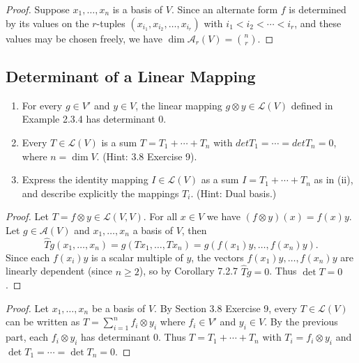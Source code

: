 \begin{proof}
    Suppose $x_1, \ldots, x_n$ is a basis of $V$.
    Since an alternate form $f$ is
    determined by its values on the $r$-tuples $(x_{i_1}, x_{i_2}, \ldots, x_{i_r})$ with
    $i_1 < i_2 < \cdots < i_r$, and these values may be chosen freely,
    we have $\dim \mathcal{A}_r(V) = \binom{n}{r}$.
\end{proof}

\subsection{Determinant of a Linear Mapping}


\begin{tcolorbox}[title=Problem 1, breakable]
    \begin{enumerate}
        \item For every $g \in V'$ and $y \in V$, the linear mapping 
        $g \otimes y \in \mathcal{L}(V)$ defined in Example 2.3.4 has determinant $0$.
        \item Every $T \in \mathcal{L}(V)$ is a sum $T = T_1 + \cdots + T_n$ with $det T_1 = \cdots = det T_n = 0$,
        where $n = \dim V$. (Hint: 3.8 Exercise 9).
        \item Express the identity mapping $I \in \mathcal{L}(V)$ as a sum $I = T_1 + \cdots + T_n$
        as in (ii), and describe explicitly the mappings $T_i$. (Hint: Dual basis.)
    \end{enumerate}
\end{tcolorbox}

\begin{proof}
    Let $T = f \otimes y \in \mathcal{L}(V, V)$.
    For all $x \in V$ we have $(f \otimes y)(x) = f(x)y$.
    Let $g \in \mathcal{A}(V)$ and $x_1, \ldots, x_n$ a basis of $V$, then 
    \[\hat{T}g(x_1, \ldots, x_n) = g(Tx_1, \ldots, Tx_n) = g(f(x_1)y, \ldots, f(x_n)y).\]
    Since each $f(x_i)y$ is a scalar multiple of $y$, the vectors $f(x_1)y, \ldots, f(x_n)y$
    are linearly dependent (since $n \ge 2$), so by Corollary 7.2.7 $\hat{T}g = 0$.
    Thus $\det T = 0$.
\end{proof}

\begin{proof}
    Let $x_1, \ldots, x_n$ be a basis of $V$.
    By Section 3.8 Exercise 9, every $T \in \mathcal{L}(V)$ can be written as
    $T = \sum_{i=1}^n f_i \otimes y_i$
    where $f_i \in V'$ and $y_i \in V$.
    By the previous part, each $f_i \otimes y_i$ has determinant $0$.
    Thus $T = T_1 + \cdots + T_n$ with $T_i = f_i \otimes y_i$ and $\det T_1 = \cdots = \det T_n = 0$.
\end{proof}

